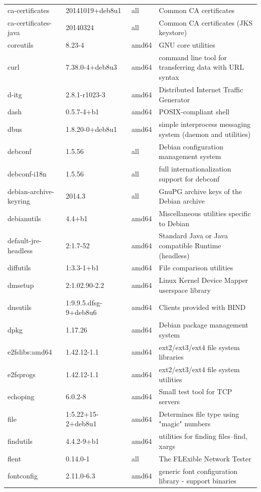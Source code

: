 \documentclass[a4paper,10pt]{article}
\begin{document}
\begin{appendices}
{\begin{longtable}{p{3.25cm}@{\hspace{0.25cm}}p{4cm}@{\hspace{0.25cm}}l@{\hspace{0.25cm}}p{7cm}}
ca-certificates	&	20141019+deb8u1	&	all	&	Common CA certificates	\\
ca-certificates-java	&	20140324	&	all	&	Common CA certificates (JKS keystore)	\\
coreutils	&	8.23-4	&	amd64	&	GNU core utilities	\\
curl	&	7.38.0-4+deb8u3	&	amd64	&	command line tool for transferring data with URL syntax	\\
d-itg	&	2.8.1-r1023-3	&	amd64	&	Distributed Internet Traffic Generator	\\
dash	&	0.5.7-4+b1	&	amd64	&	POSIX-compliant shell	\\
dbus	&	1.8.20-0+deb8u1	&	amd64	&	simple interprocess messaging system (daemon and utilities)	\\
debconf	&	1.5.56	&	all	&	Debian configuration management system	\\
debconf-i18n	&	1.5.56	&	all	&	full internationalization support for debconf	\\
debian-archive-keyring	&	2014.3	&	all	&	GnuPG archive keys of the Debian archive	\\
debianutils	&	4.4+b1	&	amd64	&	Miscellaneous utilities specific to Debian	\\
default-jre-headless	&	2:1.7-52	&	amd64	&	Standard Java or Java compatible Runtime (headless)	\\
diffutils	&	1:3.3-1+b1	&	amd64	&	File comparison utilities	\\
dmsetup	&	2:1.02.90-2.2	&	amd64	&	Linux Kernel Device Mapper userspace library	\\
dnsutils	&	1:9.9.5.dfsg-9+deb8u6	&	amd64	&	Clients provided with BIND	\\
dpkg	&	1.17.26	&	amd64	&	Debian package management system	\\
e2fslibs:amd64	&	1.42.12-1.1	&	amd64	&	ext2/ext3/ext4 file system libraries	\\
e2fsprogs	&	1.42.12-1.1	&	amd64	&	ext2/ext3/ext4 file system utilities	\\
echoping	&	6.0.2-8	&	amd64	&	Small test tool for TCP servers	\\
file	&	1:5.22+15-2+deb8u1	&	amd64	&	Determines file type using "magic" numbers	\\
findutils	&	4.4.2-9+b1	&	amd64	&	utilities for finding files--find, xargs	\\
flent	&	0.14.0-1	&	all	&	The FLExible Network Tester	\\
fontconfig	&	2.11.0-6.3	&	amd64	&	generic font configuration library - support binaries	\\

\end{longtable}}
\end{appendices}
\end{document}
